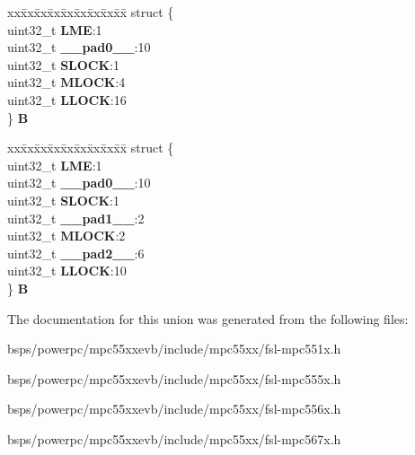 \begin{DoxyCompactItemize}
\begin{tabbing}
\end{tabbing}\item 
\mbox{\label{unionFLASH__tag_1_1LMLR__tag_a90818bb31d5104daa663beea12374899}} 
\begin{tabbing}
xx\=xx\=xx\=xx\=xx\=xx\=xx\=xx\=xx\=\kill
struct \{\\
\>uint32\_t {\bfseries LME}:1\\
\>uint32\_t {\bfseries \_\_pad0\_\_}:10\\
\>uint32\_t {\bfseries SLOCK}:1\\
\>uint32\_t {\bfseries MLOCK}:4\\
\>uint32\_t {\bfseries LLOCK}:16\\
\} {\bfseries B}\\

\end{tabbing}\item 
\mbox{\label{unionFLASH__tag_1_1LMLR__tag_a41866eddb3f676df631c01987beb9873}} 
\begin{tabbing}
xx\=xx\=xx\=xx\=xx\=xx\=xx\=xx\=xx\=\kill
struct \{\\
\>uint32\_t {\bfseries LME}:1\\
\>uint32\_t {\bfseries \_\_pad0\_\_}:10\\
\>uint32\_t {\bfseries SLOCK}:1\\
\>uint32\_t {\bfseries \_\_pad1\_\_}:2\\
\>uint32\_t {\bfseries MLOCK}:2\\
\>uint32\_t {\bfseries \_\_pad2\_\_}:6\\
\>uint32\_t {\bfseries LLOCK}:10\\
\} {\bfseries B}\\

\end{tabbing}\end{DoxyCompactItemize}


The documentation for this union was generated from the following files\+:\begin{DoxyCompactItemize}
\item 
bsps/powerpc/mpc55xxevb/include/mpc55xx/fsl-\/mpc551x.\+h\item 
bsps/powerpc/mpc55xxevb/include/mpc55xx/fsl-\/mpc555x.\+h\item 
bsps/powerpc/mpc55xxevb/include/mpc55xx/fsl-\/mpc556x.\+h\item 
bsps/powerpc/mpc55xxevb/include/mpc55xx/fsl-\/mpc567x.\+h\end{DoxyCompactItemize}
